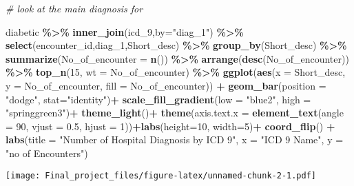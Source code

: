\documentclass[
]{article}
\newenvironment{Shaded}{\begin{snugshade}}{\end{snugshade}}
\newcommand{\AttributeTok}[1]{\textcolor[rgb]{0.13,0.29,0.53}{#1}}
\newcommand{\CommentTok}[1]{\textcolor[rgb]{0.56,0.35,0.01}{\textit{#1}}}
\newcommand{\DecValTok}[1]{\textcolor[rgb]{0.00,0.00,0.81}{#1}}
\newcommand{\FloatTok}[1]{\textcolor[rgb]{0.00,0.00,0.81}{#1}}
\newcommand{\FunctionTok}[1]{\textcolor[rgb]{0.13,0.29,0.53}{\textbf{#1}}}
\newcommand{\NormalTok}[1]{#1}
\newcommand{\SpecialCharTok}[1]{\textcolor[rgb]{0.81,0.36,0.00}{\textbf{#1}}}
\newcommand{\StringTok}[1]{\textcolor[rgb]{0.31,0.60,0.02}{#1}}
\begin{document}
\begin{Shaded}
\begin{Highlighting}[]
\CommentTok{\# look at the main diagnosis for }

\NormalTok{diabetic   }\SpecialCharTok{\%\textgreater{}\%}
  \FunctionTok{inner\_join}\NormalTok{(icd\_9,}\AttributeTok{by=}\StringTok{"diag\_1"}\NormalTok{)  }\SpecialCharTok{\%\textgreater{}\%} \FunctionTok{select}\NormalTok{(encounter\_id,diag\_1,Short\_desc) }\SpecialCharTok{\%\textgreater{}\%} 
  \FunctionTok{group\_by}\NormalTok{(Short\_desc) }\SpecialCharTok{\%\textgreater{}\%}  \FunctionTok{summarize}\NormalTok{(}\AttributeTok{No\_of\_encounter =} \FunctionTok{n}\NormalTok{()) }\SpecialCharTok{\%\textgreater{}\%} 
  \FunctionTok{arrange}\NormalTok{(}\FunctionTok{desc}\NormalTok{(No\_of\_encounter)) }\SpecialCharTok{\%\textgreater{}\%}
  \FunctionTok{top\_n}\NormalTok{(}\DecValTok{15}\NormalTok{, }\AttributeTok{wt =}\NormalTok{ No\_of\_encounter) }\SpecialCharTok{\%\textgreater{}\%}
  \FunctionTok{ggplot}\NormalTok{(}\FunctionTok{aes}\NormalTok{(}\AttributeTok{x =}\NormalTok{ Short\_desc, }\AttributeTok{y =}\NormalTok{ No\_of\_encounter, }\AttributeTok{fill =}\NormalTok{ No\_of\_encounter)) }\SpecialCharTok{+}
  \FunctionTok{geom\_bar}\NormalTok{(}\AttributeTok{position =} \StringTok{"dodge"}\NormalTok{, }\AttributeTok{stat=}\StringTok{"identity"}\NormalTok{)}\SpecialCharTok{+}
  \FunctionTok{scale\_fill\_gradient}\NormalTok{(}\AttributeTok{low =} \StringTok{"blue2"}\NormalTok{, }\AttributeTok{high =} \StringTok{"springgreen3"}\NormalTok{)}\SpecialCharTok{+}
  \FunctionTok{theme\_light}\NormalTok{()}\SpecialCharTok{+}
  \FunctionTok{theme}\NormalTok{(}\AttributeTok{axis.text.x =} \FunctionTok{element\_text}\NormalTok{(}\AttributeTok{angle =} \DecValTok{90}\NormalTok{, }\AttributeTok{vjust =} \FloatTok{0.5}\NormalTok{, }\AttributeTok{hjust =} \DecValTok{1}\NormalTok{))}\SpecialCharTok{+}\FunctionTok{labs}\NormalTok{(}\AttributeTok{height=}\DecValTok{10}\NormalTok{, }\AttributeTok{width=}\DecValTok{5}\NormalTok{)}\SpecialCharTok{+}
  \FunctionTok{coord\_flip}\NormalTok{() }\SpecialCharTok{+} \FunctionTok{labs}\NormalTok{(}\AttributeTok{title =} \StringTok{"Number of Hospital Diagnosis by ICD 9"}\NormalTok{, }\AttributeTok{x =} \StringTok{"ICD 9 Name"}\NormalTok{, }\AttributeTok{y =} \StringTok{"no of Encounters"}\NormalTok{)}
\end{Highlighting}
\end{Shaded}

\texttt{[image: Final\_project\_files/figure-latex/unnamed-chunk-2-1.pdf]}
\end{document}
